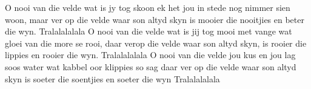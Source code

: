 \beginverse*
O nooi van die velde wat is jy tog skoon
ek het jou in stede nog nimmer sien woon,
maar ver op die velde waar son altyd skyn
is mooier die nooitjies en beter die wyn. 
Tralalalalala
\endverse
\beginverse*
O nooi van die velde wat is jij tog mooi
met vange wat gloei van die more se rooi,
daar verop die velde waar son altyd skyn,
is rooier die lippies en rooier die wyn.
Tralalalalala
\endverse
\beginverse*
O nooi van die velde jou kus en jou lag
soos water wat kabbel oor klippies so sag
daar ver op die velde waar son altyd skyn
is soeter die soentjies en soeter die wyn
Tralalalalala
\endverse
\endsong